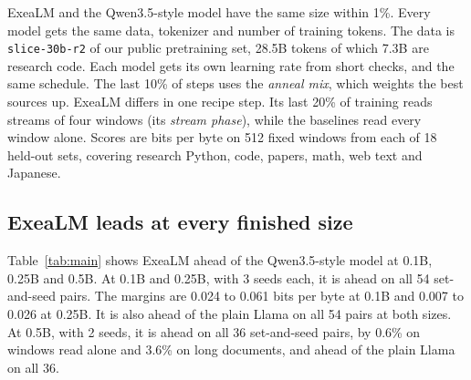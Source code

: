 \documentclass[11pt,letterpaper]{article}
\begin{document}
ExeaLM and the Qwen3.5-style model have the same size within 1\%.
Every model gets the same data, tokenizer and number of training tokens.
The data is \texttt{slice-30b-r2} of our public pretraining set, 28.5B tokens of which 7.3B are research code.
Each model gets its own learning rate from short checks, and the same schedule.
The last 10\% of steps uses the \emph{anneal mix}, which weights the best sources up.
ExeaLM differs in one recipe step.
Its last 20\% of training reads streams of four windows (its \emph{stream phase}), while the baselines read every window alone.
Scores are bits per byte on 512 fixed windows from each of 18 held-out sets, covering research Python, code, papers, math, web text and Japanese.

\subsection{ExeaLM leads at every finished size}

Table~\ref{tab:main} shows ExeaLM ahead of the Qwen3.5-style model at 0.1B, 0.25B and 0.5B.
At 0.1B and 0.25B, with 3 seeds each, it is ahead on all 54 set-and-seed pairs. The margins are 0.024 to 0.061 bits per byte at 0.1B and 0.007 to 0.026 at 0.25B.
It is also ahead of the plain Llama on all 54 pairs at both sizes.
At 0.5B, with 2 seeds, it is ahead on all 36 set-and-seed pairs, by 0.6\% on windows read alone and 3.6\% on long documents, and ahead of the plain Llama on all 36.
\end{document}
